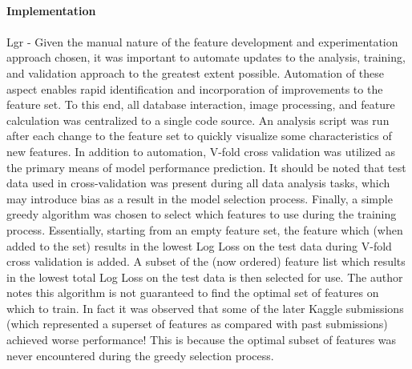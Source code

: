 \documentclass[fleqn,10pt]{SelfArx} %
\begin{document}
\paragraph{Implementation} 
\paragraph{}Lgr - Given the manual nature of the feature development and experimentation approach chosen, it was important to automate updates to the analysis, training, and validation approach to the greatest extent possible.  Automation of these aspect enables rapid identification and incorporation of improvements to the feature set.  To this end, all database interaction, image processing, and feature calculation was centralized to a single code source.  An analysis script was run after each change to the feature set to quickly visualize some characteristics of new features.  In addition to automation, V-fold cross validation was utilized as the primary means of model performance prediction.  It should be noted that test data used in cross-validation was present during all data analysis tasks, which may introduce bias as a result in the model selection process. \cite{cawley}  Finally, a simple greedy algorithm was chosen to select which features to use during the training process.  Essentially, starting from an empty feature set, the feature which (when added to the set) results in the lowest Log Loss on the test data during V-fold cross validation is added.  A subset of the (now ordered) feature list which results in the lowest total Log Loss on the test data is then selected for use.  The author notes this algorithm is not guaranteed to find the optimal set of features on which to train.  In fact it was observed that some of the later Kaggle submissions (which represented a superset of features as compared with past submissions) achieved worse performance!  This is because the optimal subset of features was never encountered during the greedy selection process.
\end{document}
